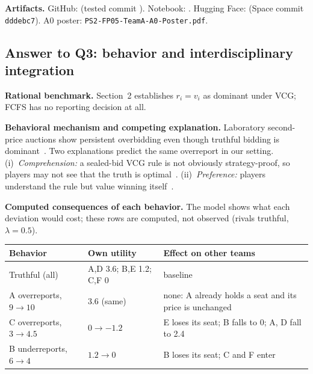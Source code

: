 \vspace{3pt}

\noindent
\textbf{Artifacts.} GitHub: \GitHubLink{} (tested commit \texttt{\TestedCommit}). Notebook: \NotebookLink. Hugging Face: \HuggingFaceLink{} (Space commit \texttt{dddebc7}). A0 poster: \texttt{PS2-FP05-TeamA-A0-Poster.pdf}.

\subsection{Answer to Q3: behavior and interdisciplinary integration}

\noindent
\textbf{Rational benchmark.} Section~2 establishes $r_i=v_i$ as dominant under VCG; FCFS has no reporting decision at all.

\vspace{3pt}

\noindent
\textbf{Behavioral mechanism and competing explanation.} Laboratory second-price auctions show persistent overbidding even though truthful bidding is dominant~\cite{kagel1987}. Two explanations predict the same overreport in our setting. (i)~\emph{Comprehension:} a sealed-bid VCG rule is not obviously strategy-proof, so players may not see that the truth is optimal~\cite{li2017}. (ii)~\emph{Preference:} players understand the rule but value winning itself~\cite{cooperfang2008}.

\vspace{3pt}

\noindent
\textbf{Computed consequences of each behavior.} The model shows what each deviation would cost; these rows are computed, not observed (rivals truthful, $\lambda=0.5$).

{\footnotesize
\begin{tabularx}{\columnwidth}{@{}p{2.25cm}p{1.45cm}Y@{}}\toprule
\textbf{Behavior} & \textbf{Own utility} & \textbf{Effect on other teams}\\\midrule
Truthful (all) & A,D 3.6; B,E 1.2; C,F 0 & baseline\\
A overreports, $9\to10$ & 3.6 (same) & none: A already holds a seat and its price is unchanged\\
C overreports, $3\to4.5$ & $0\to-1.2$ & E loses its seat; B falls to 0; A, D fall to 2.4\\
B underreports, $6\to4$ & $1.2\to0$ & B loses its seat; C and F enter\\\bottomrule
\end{tabularx}}

\vspace{3pt}

